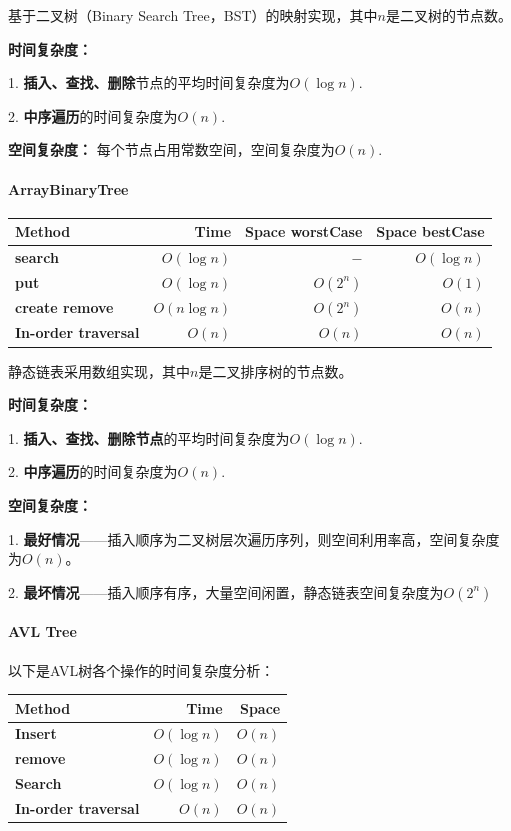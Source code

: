 \documentclass[UTF8]{ctexart}
\begin{document}
基于二叉树（Binary Search Tree，BST）的映射实现，其中$n$是二叉树的节点数。

\textbf{时间复杂度：}

1. \textbf{插入、查找、删除}节点的平均时间复杂度为$O(\log n)$.

2. \textbf{中序遍历}的时间复杂度为$O(n)$.

\textbf{空间复杂度：}
每个节点占用常数空间，空间复杂度为$O(n)$.

\paragraph*{ArrayBinaryTree}

\begin{center}
    \begin{tabular}{|l|r|r|r|} \hline
        Method & Time & Space worstCase & Space bestCase\\\hline
        \textbf{search} & $O(\log n)$ & $-$ & $O(\log n)$ \\
        \textbf{put} & $O(\log n)$ & $O(2^n)$ & $O(1)$ \\
        \textbf{create remove} & $O(n\log n)$ & $O(2^n)$ & $O(n)$ \\
        \textbf{In-order traversal} & $O(n)$ & $O(n)$ & $O(n)$ \\ \hline
    \end{tabular}
\end{center}

静态链表采用数组实现，其中$n$是二叉排序树的节点数。

\textbf{时间复杂度：}

1. \textbf{插入、查找、删除节点}的平均时间复杂度为$O(\log n)$.

2. \textbf{中序遍历}的时间复杂度为$O(n)$.

\textbf{空间复杂度：}

1. \textbf{最好情况}——插入顺序为二叉树层次遍历序列，则空间利用率高，空间复杂度为$O(n)$。

2. \textbf{最坏情况}——插入顺序有序，大量空间闲置，静态链表空间复杂度为$O(2^n)$




\paragraph*{AVL Tree}


以下是AVL树各个操作的时间复杂度分析：

\begin{center}
    \begin{tabular}{|l|r|r|} \hline
        Method & Time & Space \\\hline
        \textbf{Insert} & $O(\log n)$ & $O(n)$ \\
        \textbf{remove} & $O(\log n)$ & $O(n)$ \\
        \textbf{Search} & $O(\log n)$ & $O(n)$ \\
        \textbf{In-order traversal} & $O(n)$ & $O(n)$ \\ \hline
    \end{tabular}
\end{center}
\end{document}
